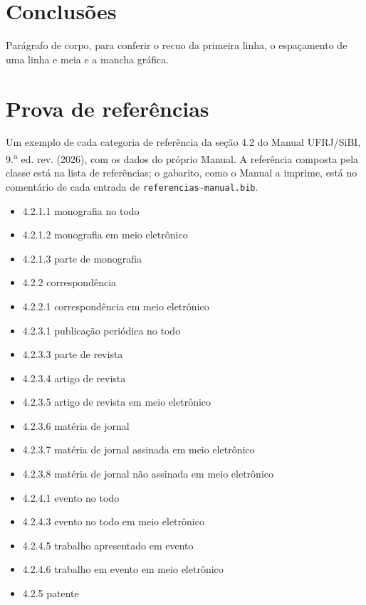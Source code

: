 \documentclass[dsc,pdfa,coorientador,numbers,twoside,orientadorexamina]{coppe}
\begin{document}
  \chapter{Conclusões}
  Parágrafo de corpo, para conferir o recuo da primeira linha, o espaçamento de uma linha e meia e a mancha gráfica.

  \chapter{Prova de referências}
  Um exemplo de cada categoria de referência da seção 4.2 do Manual
  UFRJ/SiBI, 9.\textsuperscript{a} ed. rev. (2026), com os dados do
  próprio Manual. A referência composta pela classe está na lista de
  referências; o gabarito, como o Manual a imprime, está no comentário
  de cada entrada de \texttt{referencias-manual.bib}.
  \begin{itemize}
    \item 4.2.1.1 monografia no todo \citep{m-4211}
    \item 4.2.1.2 monografia em meio eletrônico \citep{m-4212}
    \item 4.2.1.3 parte de monografia \citep{m-4213}
    \item 4.2.2 correspondência \citep{m-422}
    \item 4.2.2.1 correspondência em meio eletrônico \citep{m-4221}
    \item 4.2.3.1 publicação periódica no todo \citep{m-4231}
    \item 4.2.3.3 parte de revista \citep{m-4233}
    \item 4.2.3.4 artigo de revista \citep{m-4234}
    \item 4.2.3.5 artigo de revista em meio eletrônico \citep{m-4235}
    \item 4.2.3.6 matéria de jornal \citep{m-4236}
    \item 4.2.3.7 matéria de jornal assinada em meio eletrônico \citep{m-4237}
    \item 4.2.3.8 matéria de jornal não assinada em meio eletrônico \citep{m-4238}
    \item 4.2.4.1 evento no todo \citep{m-4241}
    \item 4.2.4.3 evento no todo em meio eletrônico \citep{m-4243}
    \item 4.2.4.5 trabalho apresentado em evento \citep{m-4245}
    \item 4.2.4.6 trabalho em evento em meio eletrônico \citep{m-4246}
    \item 4.2.5 patente \citep{m-425}

\end{itemize}
\end{document}
